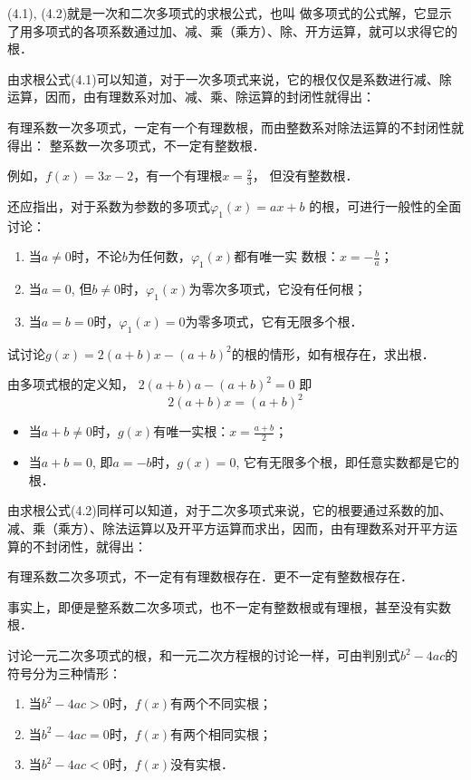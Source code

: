 (4.1), (4.2)就是一次和二次多项式的求根公式，也叫
做多项式的公式解，它显示了用多项式的各项系数通过加、减、乘（乘方）、除、开方运算，就可以求得它的根．

由求根公式(4.1)可以知道，对于一次多项式来说，它的根仅仅是系数进行减、除运算，因而，由有理数系对加、减、乘、除运算的封闭性就得出：

有理系数一次多项式，一定有一个有理数根，而由整数系对除法运算的不封闭性就得出：
整系数一次多项式，不一定有整数根．

例如，$f(x)=3x-2$，有一个有理根$x=\frac{2}{3}$，
但没有整数根．

还应指出，对于系数为参数的多项式$\varphi_1(x)=ax+b$
的根，可进行一般性的全面讨论：
\begin{enumerate}
    \item 当$a\ne 0$时，不论$b$为任何数，$\varphi_1(x)$都有唯一实
    数根：$x=-\frac{b}{a}$；
    \item 当$a=0$, 但$b\ne 0$时，$\varphi_1(x)$为零次多项式，它没有任何根；
    \item 当$a=b=0$时，$\varphi_1(x)=0$为零多项式，它有无限多个根．
\end{enumerate}

\begin{example}
    试讨论$g(x)=2(a+b)x-(a+b)^2$的根的情形，如有根存在，求出根．
\end{example}

\begin{solution}
    由多项式根的定义知，
$2 (a+b) a- (a+b)^2=0$
即
\[2 (a+b) x= (a+b)^2\]
\begin{itemize}
    \item 当$a+b\ne 0$时，$g(x)$有唯一实根：$x=\frac{a+b}{2}$；
    \item 当$a+b=0$, 即$a=-b$时，$g(x)=0$, 它有无限多个根，即任意实数都是它的根．
\end{itemize}
\end{solution}

由求根公式(4.2)同样可以知道，对于二次多项式来说，它的根要通过系数的加、减、乘（乘方）、除法运算以及开平方运算而求出，因而，由有理数系对开平方运算的不封闭性，就得出：

有理系数二次多项式，不一定有有理数根存在．更不一定有整数根存在．

事实上，即便是整系数二次多项式，也不一定有整数根或有理根，甚至没有实数根．

讨论一元二次多项式的根，和一元二次方程根的讨论一样，可由判别式$b^2-4ac$的符号分为三种情形：
\begin{enumerate}
    \item 当$b^2-4ac>0$时，$f(x)$有两个不同实根；
    \item 当$b^2-4ac=0$时，$f(x)$有两个相同实根；
    \item 当$b^2-4ac<0$时，$f(x)$没有实根．
\end{enumerate}

